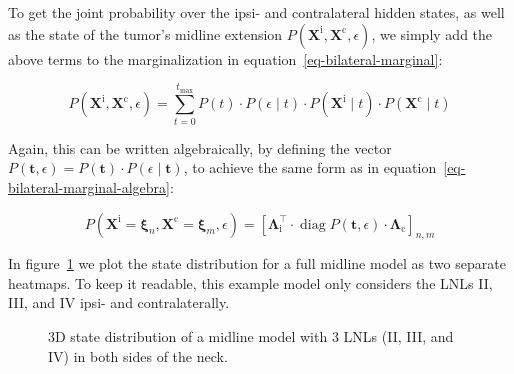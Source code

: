 \documentclass[
  sn-mathphys-num,
]{sn-jnl}
\begin{document}
To get the joint probability over the ipsi- and contralateral hidden
states, as well as the state of the tumor's midline extension
\(P \left( \mathbf{X}^\text{i}, \mathbf{X}^\text{c}, \epsilon \right)\),
we simply add the above terms to the marginalization in
equation~\ref{eq-bilateral-marginal}:

\[
P \left( \mathbf{X}^\text{i}, \mathbf{X}^\text{c}, \epsilon \right) = \sum_{t=0}^{t_\text{max}} P(t) \cdot P(\epsilon \mid t) \cdot P \left( \mathbf{X}^\text{i} \mid t \right) \cdot P \left( \mathbf{X}^\text{c} \mid t \right)
\]

Again, this can be written algebraically, by defining the vector
\(P(\mathbf{t}, \epsilon) = P(\mathbf{t}) \cdot P(\epsilon \mid \mathbf{t})\),
to achieve the same form as in
equation~\ref{eq-bilateral-marginal-algebra}:

\[
P \left( \mathbf{X}^\text{i} = \boldsymbol{\xi}_n, \mathbf{X}^\text{c} = \boldsymbol{\xi}_m, \epsilon \right) = \left[ \boldsymbol{\Lambda}^\intercal_\text{i} \cdot \operatorname{diag} P(\mathbf{t}, \epsilon) \cdot \boldsymbol{\Lambda}_\text{c} \right]_{n,m}
\]

In figure~\ref{fig-model-state-dist} we plot the state distribution for
a full midline model as two separate heatmaps. To keep it readable, this
example model only considers the LNLs II, III, and IV ipsi- and
contralaterally.

\begin{figure}


\caption{\label{fig-model-state-dist}3D state distribution of a midline
model with 3 LNLs (II, III, and IV) in both sides of the neck.}

\end{figure}%
\end{document}
